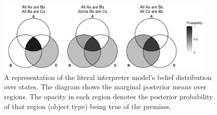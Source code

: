 \documentclass[floatsintext, doc]{apa6}
\begin{document}


%    


\begin{figure}[b]
    \centering
        \includegraphics[width = 0.95\textwidth]{figs/venn_literal_AA1_AI1_AA2_exp.pdf}
    \caption{A representation of the literal interpreter model's belief distribution over states. The diagram shows the marginal posterior means over regions. The opacity in each region denotes the posterior probability of that region (object type) being true of the premises.}
    \label{fig:lit_state_qud}
\end{figure}
\end{document}

